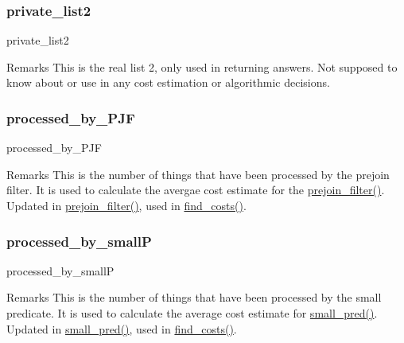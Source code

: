 \subsubsection{\texorpdfstring{private\_list2}{private\_list2}}
{\footnotesize\ttfamily private\+\_\+list2}

\begin{DoxyRemark}{Remarks}
This is the real list 2, only used in returning answers. Not supposed to know about or use in any cost estimation or algorithmic decisions. 
\end{DoxyRemark}
\mbox{\label{classdynamicfilterapp_1_1models_1_1_join_aa2631bc13bb0bd38dce175ce3f941747}} 
\subsubsection{\texorpdfstring{processed\_by\_PJF}{processed\_by\_PJF}}
{\footnotesize\ttfamily processed\+\_\+by\+\_\+\+P\+JF}

\begin{DoxyRemark}{Remarks}
This is the number of things that have been processed by the prejoin filter. It is used to calculate the avergae cost estimate for the \mbox{\hyperlink{classdynamicfilterapp_1_1models_1_1_join_ad1f0a62df23661b1591a26c02bd59664}{prejoin\+\_\+filter()}}. Updated in \mbox{\hyperlink{classdynamicfilterapp_1_1models_1_1_join_ad1f0a62df23661b1591a26c02bd59664}{prejoin\+\_\+filter()}}, used in \mbox{\hyperlink{classdynamicfilterapp_1_1models_1_1_join_ac9cef0d40608117205ed9d5118f5f87c}{find\+\_\+costs()}}. 
\end{DoxyRemark}
\mbox{\label{classdynamicfilterapp_1_1models_1_1_join_a74508ba76af18471c51aa3c69fec9c03}} 
\subsubsection{\texorpdfstring{processed\_by\_smallP}{processed\_by\_smallP}}
{\footnotesize\ttfamily processed\+\_\+by\+\_\+smallP}

\begin{DoxyRemark}{Remarks}
This is the number of things that have been processed by the small predicate. It is used to calculate the average cost estimate for \mbox{\hyperlink{classdynamicfilterapp_1_1models_1_1_join_a7f921ca8a9fa8f58520cc49ac743dcac}{small\+\_\+pred()}}. Updated in \mbox{\hyperlink{classdynamicfilterapp_1_1models_1_1_join_a7f921ca8a9fa8f58520cc49ac743dcac}{small\+\_\+pred()}}, used in \mbox{\hyperlink{classdynamicfilterapp_1_1models_1_1_join_ac9cef0d40608117205ed9d5118f5f87c}{find\+\_\+costs()}}. 
\end{DoxyRemark}
\mbox{\label{classdynamicfilterapp_1_1models_1_1_join_a83384c5efb00056d72e62f54090f162c}} 
